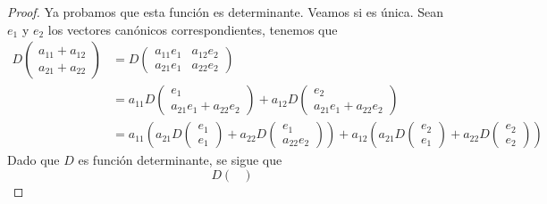 \documentclass[12pt,a4paper]{book}
\newcommand{\parentesis}[1]{\left(#1\right)}
\begin{document}
    \begin{proof}
        Ya probamos que esta función es determinante. Veamos si es única. Sean $e_1$ y $e_2$ los vectores canónicos correspondientes, tenemos que
        \begin{align*}
            D
            \begin{pmatrix}
                a_{11} + a_{12}\\
                a_{21} + a_{22}
            \end{pmatrix} & = D
            \begin{pmatrix}
                a_{11}e_{1} & a_{12}e_{2}\\
                a_{21}e_{1} & a_{22}e_{2}
            \end{pmatrix}\\
            & = a_{11}D
            \begin{pmatrix}
                e_{1}\\
                a_{21}e_{1}+a_{22}e_{2}
            \end{pmatrix}
            + a_{12}D
            \begin{pmatrix}
                e_{2}\\
                a_{21}e_{1}+a_{22}e_{2}
            \end{pmatrix}\\
            &=a_{11}\parentesis{
                a_{21}D
                \begin{pmatrix}
                    e_{1}\\
                    e_{1}
                \end{pmatrix}
                +a_{22}D
                \begin{pmatrix}
                   e_{1}\\
                   a_{22}e_{2}
                \end{pmatrix}
                }
             + a_{12} \parentesis{a_{21}D\begin{pmatrix}
                e_2\\e_1
            \end{pmatrix}
             + a_{22}D \begin{pmatrix}
                 e_2\\e_2
             \end{pmatrix}
             } \tag{4.1.1} \label{4.1.1}
        \end{align*}
        Dado que $D$ es función determinante, se sigue que
        \[
        D\begin{pmatrix}

\end{pmatrix}\]
\end{proof}
\end{document}

